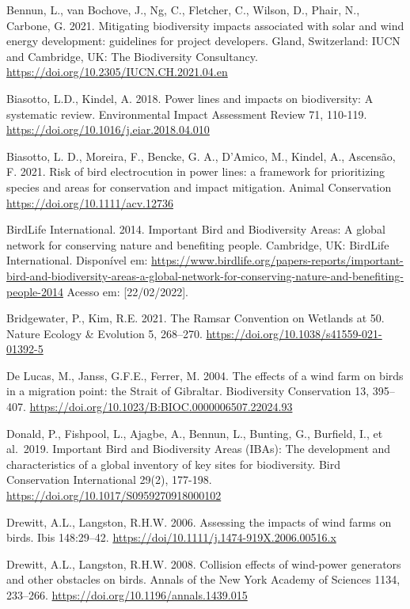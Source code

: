 \documentclass[
  oneside]{scrbook}
\begin{document}
Bennun, L., van Bochove, J., Ng, C., Fletcher, C., Wilson, D., Phair, N., Carbone, G. 2021. Mitigating biodiversity impacts associated with solar and wind energy development: guidelines for project developers. Gland, Switzerland: IUCN and Cambridge, UK: The Biodiversity Consultancy. \url{https://doi.org/10.2305/IUCN.CH.2021.04.en}

Biasotto, L.D., Kindel, A. 2018. Power lines and impacts on biodiversity: A systematic review. Environmental Impact Assessment Review 71, 110-119. \url{https://doi.org/10.1016/j.eiar.2018.04.010}

Biasotto, L. D., Moreira, F., Bencke, G. A., D'Amico, M., Kindel, A., Ascensão, F. 2021. Risk of bird electrocution in power lines: a framework for prioritizing species and areas for conservation and impact mitigation. Animal Conservation \url{https://doi.org/10.1111/acv.12736}

BirdLife International. 2014. Important Bird and Biodiversity Areas: A global network for conserving nature and benefiting people. Cambridge, UK: BirdLife International. Disponível em: \url{https://www.birdlife.org/papers-reports/important-bird-and-biodiversity-areas-a-global-network-for-conserving-nature-and-benefiting-people-2014} Acesso em: {[}22/02/2022{]}.

Bridgewater, P., Kim, R.E. 2021. The Ramsar Convention on Wetlands at 50. Nature Ecology \& Evolution 5, 268--270. \url{https://doi.org/10.1038/s41559-021-01392-5}

De Lucas, M., Janss, G.F.E., Ferrer, M. 2004. The effects of a wind farm on birds in a migration point: the Strait of Gibraltar. Biodiversity Conservation 13, 395--407. \url{https://doi.org/10.1023/B:BIOC.0000006507.22024.93}

Donald, P., Fishpool, L., Ajagbe, A., Bennun, L., Bunting, G., Burfield, I., et al.~2019. Important Bird and Biodiversity Areas (IBAs): The development and characteristics of a global inventory of key sites for biodiversity. Bird Conservation International 29(2), 177-198. \url{https://doi.org/10.1017/S0959270918000102}

Drewitt, A.L., Langston, R.H.W. 2006. Assessing the impacts of wind farms on birds. Ibis 148:29--42. \url{https://doi/10.1111/j.1474-919X.2006.00516.x}

Drewitt, A.L., Langston, R.H.W. 2008. Collision effects of wind-power generators and other obstacles on birds. Annals of the New York Academy of Sciences 1134, 233--266. \url{https://doi.org/10.1196/annals.1439.015}
\end{document}
